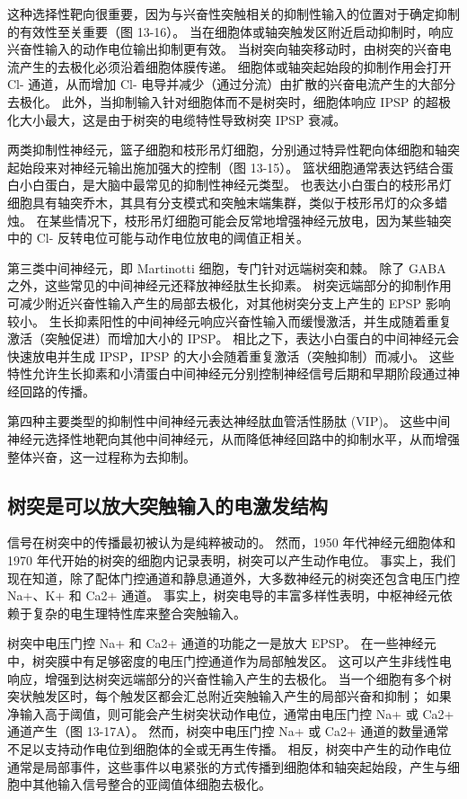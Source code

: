 这种选择性靶向很重要，因为与兴奋性突触相关的抑制性输入的位置对于确定抑制的有效性至关重要（图 13-16）。 
当在细胞体或轴突触发区附近启动抑制时，响应兴奋性输入的动作电位输出抑制更有效。 
当树突向轴突移动时，由树突的兴奋电流产生的去极化必须沿着细胞体膜传递。 
细胞体或轴突起始段的抑制作用会打开 Cl- 通道，从而增加 Cl- 电导并减少（通过分流）由扩散的兴奋电流产生的大部分去极化。 
此外，当抑制输入针对细胞体而不是树突时，细胞体响应 IPSP 的超极化大小最大，这是由于树突的电缆特性导致树突 IPSP 衰减。


两类抑制性神经元，篮子细胞和枝形吊灯细胞，分别通过特异性靶向体细胞和轴突起始段来对神经元输出施加强大的控制（图 13-15）。 
篮状细胞通常表达钙结合蛋白小白蛋白，是大脑中最常见的抑制性神经元类型。 
也表达小白蛋白的枝形吊灯细胞具有轴突乔木，其具有分支模式和突触末端集群，类似于枝形吊灯的众多蜡烛。 
在某些情况下，枝形吊灯细胞可能会反常地增强神经元放电，因为某些轴突中的 Cl- 反转电位可能与动作电位放电的阈值正相关。


第三类中间神经元，即 Martinotti 细胞，专门针对远端树突和棘。 
除了 GABA 之外，这些常见的中间神经元还释放神经肽生长抑素。 
树突远端部分的抑制作用可减少附近兴奋性输入产生的局部去极化，对其他树突分支上产生的 EPSP 影响较小。 
生长抑素阳性的中间神经元响应兴奋性输入而缓慢激活，并生成随着重复激活（突触促进）而增加大小的 IPSP。 
相比之下，表达小白蛋白的中间神经元会快速放电并生成 IPSP，IPSP 的大小会随着重复激活（突触抑制）而减小。 
这些特性允许生长抑素和小清蛋白中间神经元分别控制神经信号后期和早期阶段通过神经回路的传播。


第四种主要类型的抑制性中间神经元表达神经肽血管活性肠肽 (VIP)。 
这些中间神经元选择性地靶向其他中间神经元，从而降低神经回路中的抑制水平，从而增强整体兴奋，这一过程称为去抑制。


\subsection{树突是可以放大突触输入的电激发结构}
信号在树突中的传播最初被认为是纯粹被动的。 
然而，1950 年代神经元细胞体和 1970 年代开始的树突的细胞内记录表明，树突可以产生动作电位。 
事实上，我们现在知道，除了配体门控通道和静息通道外，大多数神经元的树突还包含电压门控 Na+、K+ 和 Ca2+ 通道。 
事实上，树突电导的丰富多样性表明，中枢神经元依赖于复杂的电生理特性库来整合突触输入。


树突中电压门控 Na+ 和 Ca2+ 通道的功能之一是放大 EPSP。 
在一些神经元中，树突膜中有足够密度的电压门控通道作为局部触发区。 
这可以产生非线性电响应，增强到达树突远端部分的兴奋性输入产生的去极化。
当一个细胞有多个树突状触发区时，每个触发区都会汇总附近突触输入产生的局部兴奋和抑制；
如果净输入高于阈值，则可能会产生树突状动作电位，通常由电压门控 Na+ 或 Ca2+ 通道产生（图 13-17A）。
然而，树突中电压门控 Na+ 或 Ca2+ 通道的数量通常不足以支持动作电位到细胞体的全或无再生传播。
相反，树突中产生的动作电位通常是局部事件，这些事件以电紧张的方式传播到细胞体和轴突起始段，产生与细胞中其他输入信号整合的亚阈值体细胞去极化。


